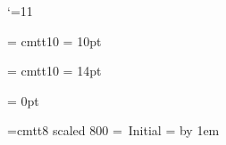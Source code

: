 

\def\Yacas{{\sffamily yacas\/}}
\def\yacasheadersize{\tiny}

\newif\ifyacaslines
\yacaslinestrue


\catcode`\@=11\relax
\newdimen\yacasinputbaselineskip
\newdimen\yacasoutputbaselineskip
\newdimen\preyacasspace


\font\yacasinputfont = cmtt10
\yacasinputbaselineskip = 10pt

\font\yacasoutputfont = cmtt10
\yacasoutputbaselineskip = 14pt

\preyacasspace = 0pt



\font\yac@sheaderfont=cmtt8  scaled 800
=\hbox{\yac@sheaderfont\ Initial}
\newdimen\in@t
\in@t = 
\advance\in@t by 1em

\def\sm@llsk{\vskip 1ex}

\def\yac@stop{
\vskip -1ex
\hbox to \hsize{\vrule depth 1ex  height .3pt width .4pt
                \vrule height .4pt depth 0pt width 1.1em 
                \lower .4ex \hbox{\yacasheadersize\ \Yacas} 
                \hrulefill 
                \vrule depth 1ex height .3pt width .4pt}
\vskip 1ex}


\def\yac@sinittop{
\vskip -1ex
\hbox to \hsize{\vrule depth 1ex  height .3pt width .4pt
                \vrule height .4pt depth 0pt width 1.1em 
                \lower .4ex \hbox{\yacasheadersize\ \Yacas} 
                \hrulefill
                \lower .4ex \hbox{\yac@sheaderfont\ Initial}
                \vrule height .4pt depth 0pt width 1em 
                \vrule depth 1ex height .3pt width .4pt}
\vskip 1ex}

\def\yac@sparttop#1{
\vskip -1ex
\hbox to \hsize{\vrule depth 1ex  height .3pt width .4pt
                \vrule height .4pt depth 0pt width 1.1em 
                \lower .4ex \hbox{\yacasheadersize\ \Yacas} 
                \hrulefill
                \lower .4ex \hbox{\yac@sheaderfont\ #1}
                \hrulefill
                \vrule height .4pt depth 0pt width \in@t
                \vrule depth 1ex height .3pt width .4pt}
\vskip 1ex}

